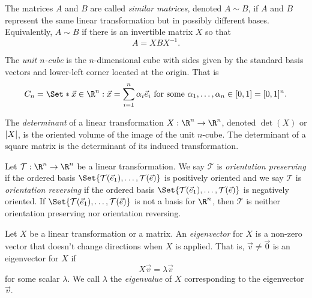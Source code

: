 \begin{SaveDefinition}[key=SimilarMatrices, title={Similar Matrices}]
	The matrices $A$ and $B$ are called
	\emph{similar matrices}, denoted $A\sim B$, if $A$ and $B$ represent the
	same linear transformation but in possibly different bases. Equivalently,
	$A\sim B$ if there is an invertible matrix $X$ so that
	\[
		A=XBX^{-1}.
	\]

\end{SaveDefinition}

\begin{SaveDefinition}[key=Unitncube, title={Unit $n$-cube}]
	The
	\emph{unit $n$-cube} is the $n$-dimensional cube with sides given by the
	standard basis vectors and lower-left corner located at the origin. That
	is
	\[
		C_{n}=\Set*{\vec x\in\R^n:\vec x=\sum_{i=1}^n\alpha_i\vec e_i\text{
		for some }\alpha_1,\ldots,\alpha_n\in[0,1]}=[0,1]^{n}.
	\]

\end{SaveDefinition}

\begin{SaveDefinition}[key=Determinant, title={Determinant}]
	The
	\emph{determinant} of a linear transformation $X:\R^{n}\to \R^{n}$, denoted $\det(X)$ or $\lvert X\rvert$, is
	the oriented volume of the image of the unit $n$-cube. The determinant of
	a square matrix is the determinant of its induced transformation.
\end{SaveDefinition}

\begin{SaveDefinition}[key=OrientationPreservingLinearTransformation, title={Orientation Preserving Linear Transformation}]
	Let $\mathcal T:\R^n\to\R^n$ be a linear transformation. We say $\mathcal T$
	is \emph{orientation preserving} if the ordered basis $\Set{\mathcal T(\vec e_1),\ldots, \mathcal T(\vec e)}$
	is positively oriented  and we say $\mathcal T$
	is \emph{orientation reversing} if the ordered basis $\Set{\mathcal T(\vec e_1),\ldots, \mathcal T(\vec e)}$
	is negatively oriented. If $\Set{\mathcal T(\vec e_1),\ldots, \mathcal T(\vec e)}$
	is not a basis for $\R^n$, then $\mathcal T$ is neither orientation preserving nor orientation reversing.
\end{SaveDefinition}

\begin{SaveDefinition}[key=Eigenvector, title={Eigenvector}]
	Let $X$ be a linear transformation or a matrix. An
	\emph{eigenvector} for $X$ is a non-zero vector that doesn't change
	directions when $X$ is applied. That is, $\vec v\neq \vec 0$ is an
	eigenvector for $X$ if
	\[
		X\vec v=\lambda \vec v
	\]
	 for some scalar $\lambda$. We call $\lambda$ the
	\emph{eigenvalue} of $X$ corresponding to the eigenvector $\vec v$.
\end{SaveDefinition}

